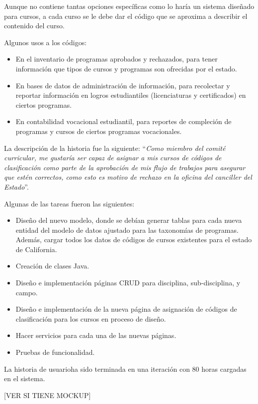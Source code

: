 Aunque no contiene tantas opciones específicas como lo haría un sistema diseñado para cursos, a cada curso se le debe dar el código que se aproxima a describir el contenido del curso.

Algunos usos a los códigos:
\begin{itemize}
	\item En el inventario de programas aprobados y rechazados, para tener información que tipos de cursos y programas son ofrecidas por el estado.
	\item En bases de datos de administración de información, para recolectar y reportar información en logros estudiantiles (licenciaturas y certificados) en ciertos programas.
	\item En contabilidad vocacional estudiantil, para reportes de compleción de programas y cursos de ciertos programas vocacionales.
\end{itemize}

La descripción de la historia fue la siguiente: \enquote{\textit{Como miembro del comité curricular, me gustaría ser capaz de asignar a mis cursos de códigos de clasificación como parte de la aprobación de mis flujo de trabajos para asegurar que estén correctos, como esto es motivo de rechazo en la oficina del canciller del Estado}}.

Algunas de las tareas fueron las siguientes:
\begin{itemize}
	\item Diseño del nuevo modelo, donde se debían generar tablas para cada nueva entidad del modelo de datos ajustado para las taxonomías de programas. Además, cargar todos los datos de códigos de cursos existentes para el estado de California.
	\item Creación de clases Java.
	\item Diseño e implementación páginas CRUD para disciplina, sub-disciplina, y campo.
	\item Diseño e implementación de la nueva página de asignación de códigos de clasificación para los cursos en proceso de diseño.
	\item Hacer servicios para cada una de las nuevas páginas.
	\item Pruebas de funcionalidad.
\end{itemize}

La historia de usuarioha sido terminada en una iteración con 80 horas cargadas en el sistema.


[VER SI TIENE MOCKUP]